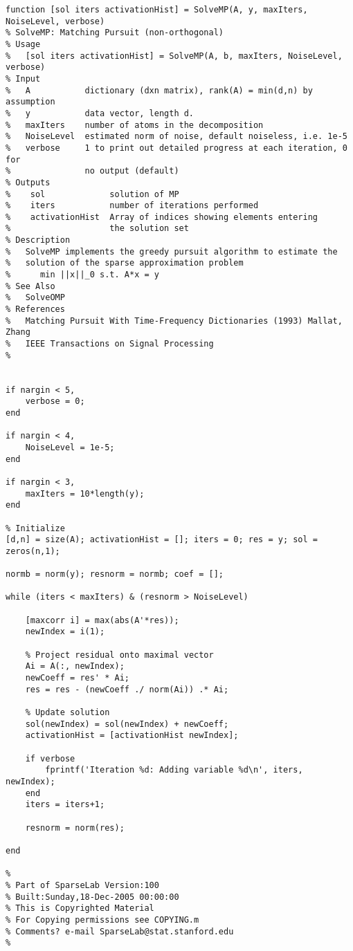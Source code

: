 \documentclass{article}
\begin{document}
\begin{verbatim}
function [sol iters activationHist] = SolveMP(A, y, maxIters,
NoiseLevel, verbose)
% SolveMP: Matching Pursuit (non-orthogonal)
% Usage
%   [sol iters activationHist] = SolveMP(A, b, maxIters, NoiseLevel, verbose)
% Input
%   A           dictionary (dxn matrix), rank(A) = min(d,n) by assumption
%   y           data vector, length d.
%   maxIters    number of atoms in the decomposition
%   NoiseLevel  estimated norm of noise, default noiseless, i.e. 1e-5
%   verbose     1 to print out detailed progress at each iteration, 0 for
%               no output (default)
% Outputs
%    sol             solution of MP
%    iters           number of iterations performed
%    activationHist  Array of indices showing elements entering
%                    the solution set
% Description
%   SolveMP implements the greedy pursuit algorithm to estimate the
%   solution of the sparse approximation problem
%      min ||x||_0 s.t. A*x = y
% See Also
%   SolveOMP
% References
%   Matching Pursuit With Time-Frequency Dictionaries (1993) Mallat, Zhang
%   IEEE Transactions on Signal Processing
%


if nargin < 5,
    verbose = 0;
end

if nargin < 4,
    NoiseLevel = 1e-5;
end

if nargin < 3,
    maxIters = 10*length(y);
end

% Initialize
[d,n] = size(A); activationHist = []; iters = 0; res = y; sol =
zeros(n,1);

normb = norm(y); resnorm = normb; coef = [];

while (iters < maxIters) & (resnorm > NoiseLevel)

    [maxcorr i] = max(abs(A'*res));
    newIndex = i(1);

    % Project residual onto maximal vector
    Ai = A(:, newIndex);
    newCoeff = res' * Ai;
    res = res - (newCoeff ./ norm(Ai)) .* Ai;

    % Update solution
    sol(newIndex) = sol(newIndex) + newCoeff;
    activationHist = [activationHist newIndex];

    if verbose
        fprintf('Iteration %d: Adding variable %d\n', iters, newIndex);
    end
    iters = iters+1;

    resnorm = norm(res);

end

%
% Part of SparseLab Version:100
% Built:Sunday,18-Dec-2005 00:00:00
% This is Copyrighted Material
% For Copying permissions see COPYING.m
% Comments? e-mail SparseLab@stat.stanford.edu
%
\end{verbatim}
\end{document}
